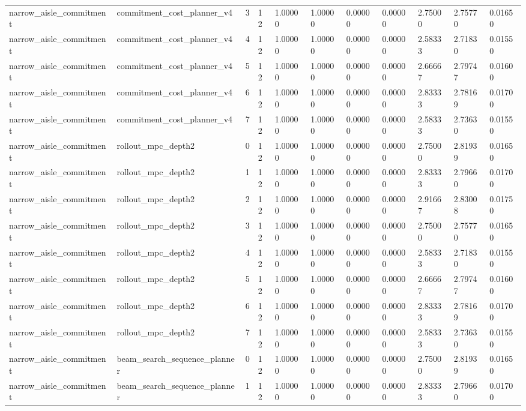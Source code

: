 \documentclass{article}
\begin{document}
\begin{table}[tbp]
{\begin{tabular}{lllllllllll}
narrow\_aisle\_commitment & commitment\_cost\_planner\_v4 & 3 & 12 & 1.00000 & 1.00000 & 0.00000 & 0.00000 & 2.75000 & 2.75770 & 0.01650 \\
narrow\_aisle\_commitment & commitment\_cost\_planner\_v4 & 4 & 12 & 1.00000 & 1.00000 & 0.00000 & 0.00000 & 2.58333 & 2.71830 & 0.01550 \\
narrow\_aisle\_commitment & commitment\_cost\_planner\_v4 & 5 & 12 & 1.00000 & 1.00000 & 0.00000 & 0.00000 & 2.66667 & 2.79747 & 0.01600 \\
narrow\_aisle\_commitment & commitment\_cost\_planner\_v4 & 6 & 12 & 1.00000 & 1.00000 & 0.00000 & 0.00000 & 2.83333 & 2.78169 & 0.01700 \\
narrow\_aisle\_commitment & commitment\_cost\_planner\_v4 & 7 & 12 & 1.00000 & 1.00000 & 0.00000 & 0.00000 & 2.58333 & 2.73630 & 0.01550 \\
narrow\_aisle\_commitment & rollout\_mpc\_depth2 & 0 & 12 & 1.00000 & 1.00000 & 0.00000 & 0.00000 & 2.75000 & 2.81939 & 0.01650 \\
narrow\_aisle\_commitment & rollout\_mpc\_depth2 & 1 & 12 & 1.00000 & 1.00000 & 0.00000 & 0.00000 & 2.83333 & 2.79660 & 0.01700 \\
narrow\_aisle\_commitment & rollout\_mpc\_depth2 & 2 & 12 & 1.00000 & 1.00000 & 0.00000 & 0.00000 & 2.91667 & 2.83008 & 0.01750 \\
narrow\_aisle\_commitment & rollout\_mpc\_depth2 & 3 & 12 & 1.00000 & 1.00000 & 0.00000 & 0.00000 & 2.75000 & 2.75770 & 0.01650 \\
narrow\_aisle\_commitment & rollout\_mpc\_depth2 & 4 & 12 & 1.00000 & 1.00000 & 0.00000 & 0.00000 & 2.58333 & 2.71830 & 0.01550 \\
narrow\_aisle\_commitment & rollout\_mpc\_depth2 & 5 & 12 & 1.00000 & 1.00000 & 0.00000 & 0.00000 & 2.66667 & 2.79747 & 0.01600 \\
narrow\_aisle\_commitment & rollout\_mpc\_depth2 & 6 & 12 & 1.00000 & 1.00000 & 0.00000 & 0.00000 & 2.83333 & 2.78169 & 0.01700 \\
narrow\_aisle\_commitment & rollout\_mpc\_depth2 & 7 & 12 & 1.00000 & 1.00000 & 0.00000 & 0.00000 & 2.58333 & 2.73630 & 0.01550 \\
narrow\_aisle\_commitment & beam\_search\_sequence\_planner & 0 & 12 & 1.00000 & 1.00000 & 0.00000 & 0.00000 & 2.75000 & 2.81939 & 0.01650 \\
narrow\_aisle\_commitment & beam\_search\_sequence\_planner & 1 & 12 & 1.00000 & 1.00000 & 0.00000 & 0.00000 & 2.83333 & 2.79660 & 0.01700 \\

\end{tabular}}
\end{table}
\end{document}
